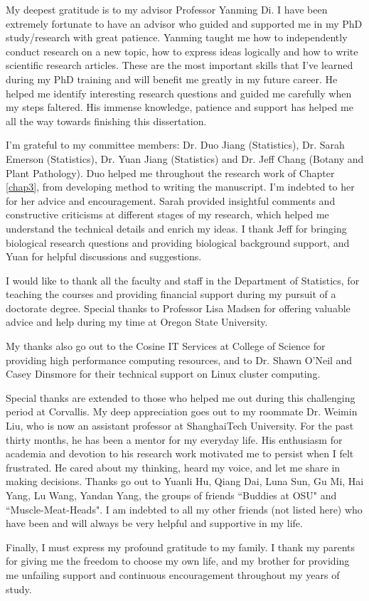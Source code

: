 
My deepest gratitude is to my advisor Professor Yanming Di. I have been extremely fortunate to have 
an advisor 
who guided and supported me in my PhD study/research with great patience. Yanming taught me how to 
independently conduct research on a new topic, how to express ideas logically and how to write 
scientific research articles. These are the most important skills that I've learned during my PhD 
training and will benefit me greatly in my future career. He helped me identify interesting 
research questions and guided me carefully when my steps faltered. His immense knowledge, patience 
and support has helped me all the way towards finishing this dissertation.

I'm grateful to my committee members: Dr. Duo Jiang (Statistics), Dr. Sarah Emerson (Statistics), 
Dr. Yuan Jiang (Statistics) and Dr. Jeff Chang (Botany and Plant Pathology). Duo helped me 
throughout the research work of Chapter \ref{chap3}, from developing 
method to writing the manuscript. I'm indebted to her for her advice and encouragement. Sarah 
provided 
insightful comments and constructive criticisms at different stages of my research, which helped me 
understand the technical details and enrich my ideas. I thank Jeff for bringing biological research 
questions and providing biological background support, and Yuan for helpful discussions and 
suggestions. 

I would like to thank all the faculty and staff in the Department of Statistics, for teaching 
the courses and providing financial support during my pursuit of a doctorate degree. Special 
thanks to Professor Lisa Madsen for offering valuable advice and help during my time at Oregon 
State University. 

My thanks also go out to the Cosine IT Services at College of Science for providing high 
performance computing resources, and to Dr. Shawn O'Neil and Casey Dinsmore for their technical 
support on Linux cluster computing. 

Special thanks are extended to those who helped me out during this challenging period at Corvallis. 
My deep appreciation goes out to my roommate Dr. Weimin Liu, who is now an assistant professor at 
ShanghaiTech University. For the past thirty months, he has been a mentor for my everyday life. His 
enthusiasm for academia and devotion to his research work motivated me to persist when I felt 
frustrated. He cared about my thinking, heard my voice, and let me share in making decisions. 
Thanks go out to Yuanli Hu, Qiang Dai, Luna Sun, Gu Mi, Hai Yang, Lu Wang, Yandan Yang, the groups 
of friends ``Buddies at OSU" and ``Muscle-Meat-Heads". I am indebted to all my other friends (not 
listed here) who have been and will always be very helpful and supportive in my life.


Finally, I must express my profound gratitude to my family. I thank my parents for giving me the 
freedom to choose my own life, and my brother for providing me unfailing support and continuous 
encouragement throughout my years of study. %



